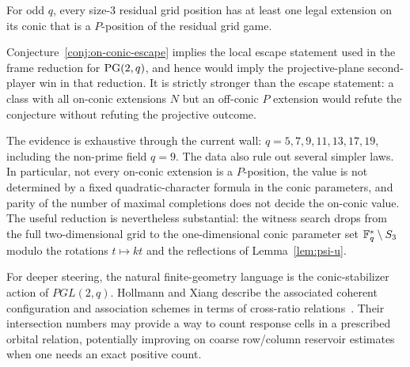 \begin{conjecture}
\label{conj:on-conic-escape}
For odd $q$, every size-$3$ residual grid position has at least one legal extension on its
conic that is a $P$-position of the residual grid game.
\end{conjecture}

Conjecture~\ref{conj:on-conic-escape} implies the local escape statement used in the frame
reduction for $\mathrm{PG}(2,q)$, and hence would imply the projective-plane second-player win in
that reduction. It is strictly stronger than the escape statement: a class with all on-conic
extensions $N$ but an off-conic $P$ extension would refute the conjecture without refuting the
projective outcome.

The evidence is exhaustive through the current wall: $q=5,7,9,11,13,17,19$, including the
non-prime field $q=9$. The data also rule out several simpler laws. In particular, not every
on-conic extension is a $P$-position, the value is not determined by a fixed quadratic-character
formula in the conic parameters, and parity of the number of maximal completions does not decide
the on-conic value. The useful reduction is nevertheless substantial: the witness search drops
from the full two-dimensional grid to the one-dimensional conic parameter set
$\mathbb{F}_q^\ast\setminus S_3$ modulo the rotations $t\mapsto kt$ and the reflections of
Lemma~\ref{lem:psi-u}.

For deeper steering, the natural finite-geometry language is the conic-stabilizer action of
$PGL(2,q)$. Hollmann and Xiang describe the associated coherent configuration and association
schemes in terms of cross-ratio relations~\cite{hollmann2005pglconic}. Their intersection numbers
may provide a way to count response cells in a prescribed orbital relation, potentially improving
on coarse row/column reservoir estimates when one needs an exact positive count.
